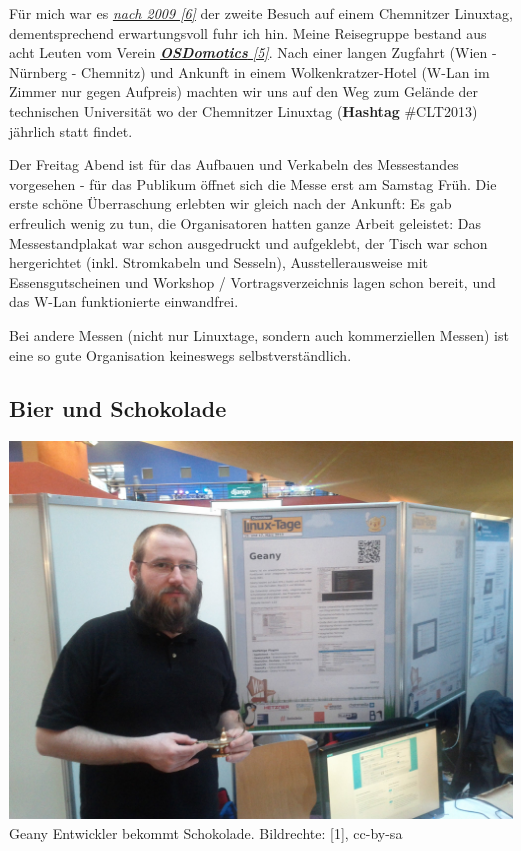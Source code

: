 Für mich war es \href{http://spielend-programmieren.at/de:sonstiges:alter_blog:2009:0318_chemnitzer_linux-tage_2009}{\textit{nach 2009 [6]}} der zweite Besuch auf einem Chemnitzer Linuxtag, dementsprechend erwartungsvoll fuhr ich hin. Meine Reisegruppe bestand aus acht Leuten vom Verein \href{http://osdomotics.com}{\textit{\textbf{OSDomotics} [5]}}. Nach einer langen Zugfahrt (Wien - Nürnberg - Chemnitz) und Ankunft in einem Wolkenkratzer-Hotel (W-Lan im Zimmer nur gegen Aufpreis) machten wir uns auf den Weg zum Gelände der technischen Universität wo der Chemnitzer Linuxtag (\textbf{Hashtag} \#CLT2013) jährlich statt findet.

Der Freitag Abend ist für das Aufbauen und Verkabeln des Messestandes vorgesehen - für das Publikum öffnet sich die Messe erst am Samstag Früh. Die erste schöne Überraschung erlebten wir gleich nach der Ankunft: Es gab erfreulich wenig zu tun, die Organisatoren hatten ganze Arbeit geleistet: Das Messestandplakat war schon ausgedruckt und aufgeklebt, der Tisch war schon hergerichtet (inkl. Stromkabeln und Sesseln), Ausstellerausweise mit Essensgutscheinen und Workshop / Vortragsverzeichnis lagen schon bereit, und das W-Lan funktionierte einwandfrei. 

Bei andere Messen (nicht nur Linuxtage, sondern auch kommerziellen Messen) ist eine so gute Organisation keineswegs selbstverständlich.


\subsection*{Bier und Schokolade}

\begin{center}
\includegraphics[width=\linewidth]{chemnitz/chemnitz_geany1.jpg}
\footnotesize{Geany Entwickler bekommt Schokolade. Bildrechte: [1], cc-by-sa}
\end{center}

